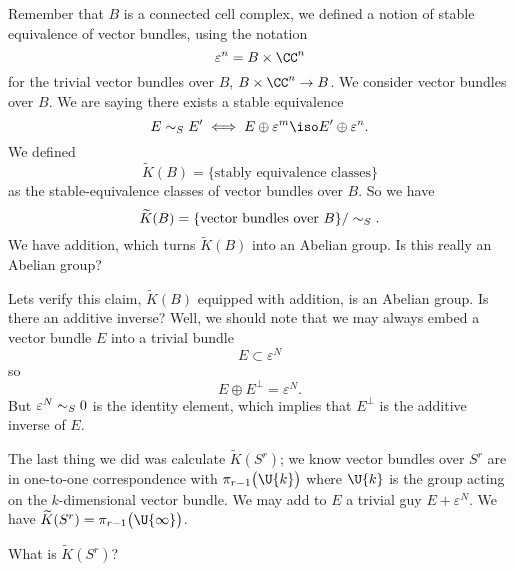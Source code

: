 Remember that $B$ is a connected cell complex, we defined a
notion of stable equivalence of vector bundles, using the
notation
\begin{equation}
\varepsilon^n=B\times\CC^n
\end{equation}
for the trivial vector bundles over $B$, $B\times\CC^n\to B$. We
consider vector bundles over $B$. We are saying there exists a
stable equivalence
\begin{equation}
E\stabequiv E'\iff E\oplus\varepsilon^m\iso E'\oplus\varepsilon^n.
\end{equation}
We defined
\begin{equation}
\widetilde{K}(B)=\{\mbox{stably equivalence classes}\}
\end{equation}
as the stable-equivalence classes of vector bundles over $B$. So
we have
\begin{equation}
\widetilde{K}(B)=\{\mbox{vector bundles over }B\}/\sim_{S}.
\end{equation}
We have addition, which turns $\widetilde{K}(B)$ into an Abelian group.
Is this really an Abelian group?

Lets verify this claim, $\widetilde{K}(B)$ equipped with
addition, is an Abelian group. Is there an additive inverse?
Well, we should note that we may always embed a vector bundle $E$
into a trivial bundle
\begin{equation}
E\subset\varepsilon^N
\end{equation}
so
\begin{equation}
E\oplus E^{\bot}=\varepsilon^N.
\end{equation}
But $\varepsilon^N\sim_{S}0$ is the identity element, which
implies that $E^\bot$ is the additive inverse of $E$.

The last thing we did was calculate $\widetilde{K}(S^{r})$; we
know vector bundles over $S^{r}$ are in one-to-one correspondence
with $\pi_{r-1}\bigl(\U{k}\bigr)$ where $\U{k}$ is the group
acting on the $k$-dimensional vector bundle. We may add to $E$ a
trivial guy $E+\varepsilon^N$. We have
$\widetilde{K}(S^{r})=\pi_{r-1}\bigl(\U{\infty}\bigr)$. 

\begin{prob}
What is $\widetilde{K}(S^{r})$?
\end{prob}

